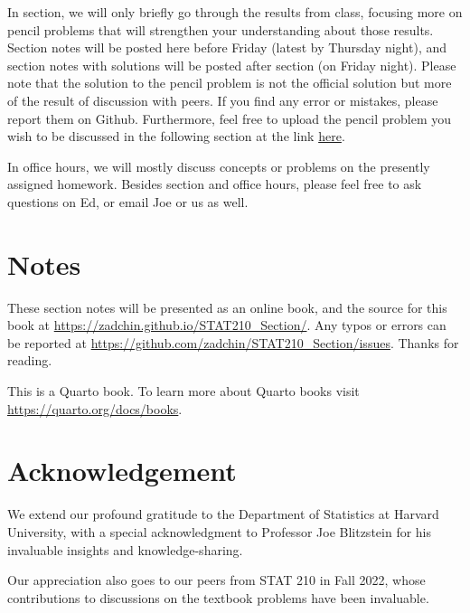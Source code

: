 \documentclass[
  letterpaper,
  DIV=11,
  numbers=noendperiod]{scrreprt}
\theoremstyle{plain}
\theoremstyle{definition}
\theoremstyle{remark}
\begin{document}
In section, we will only briefly go through the results from class,
focusing more on pencil problems that will strengthen your understanding
about those results. Section notes will be posted here before Friday
(latest by Thursday night), and section notes with solutions will be
posted after section (on Friday night). Please note that the solution to
the pencil problem is not the official solution but more of the result
of discussion with peers. If you find any error or mistakes, please
report them on Github. Furthermore, feel free to upload the pencil
problem you wish to be discussed in the following section at the link
\href{https://forms.gle/RBmMNYJp4u3qD5W79}{here}.

In office hours, we will mostly discuss concepts or problems on the
presently assigned homework. Besides section and office hours, please
feel free to ask questions on Ed, or email Joe or us as well.

\hypertarget{notes}{%
\section*{Notes}\label{notes}}


These section notes will be presented as an online book, and the source
for this book at \url{https://zadchin.github.io/STAT210_Section/}. Any
typos or errors can be reported at
\url{https://github.com/zadchin/STAT210_Section/issues}. Thanks for
reading.

This is a Quarto book. To learn more about Quarto books visit
\url{https://quarto.org/docs/books}.

\hypertarget{acknowledgement}{%
\section*{Acknowledgement}\label{acknowledgement}}


We extend our profound gratitude to the Department of Statistics at
Harvard University, with a special acknowledgment to Professor Joe
Blitzstein for his invaluable insights and knowledge-sharing.

Our appreciation also goes to our peers from STAT 210 in Fall 2022,
whose contributions to discussions on the textbook problems have been
invaluable.

\(\,\)
\end{document}
